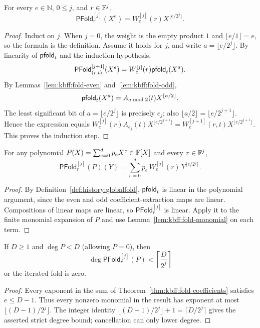 \begin{lemma}\label{lem:kbff:fold-monomial}
For every $e\in\mathbb N$, $0\leq j$, and $r\in\mathbb{F}^j$,
\[
 \mathsf{PFold}^{[j]}_r(X^e)
 =W_e^{[j]}(r)X^{\lfloor e/2^j\rfloor}.
\]
\end{lemma}
\begin{proof}
Induct on $j$. When $j=0$, the weight is the empty product $1$ and
$\lfloor e/1\rfloor=e$, so the formula is the definition.
Assume it holds for $j$, and write $a=\lfloor e/2^j\rfloor$.
By linearity of $\mathsf{pfold}_t$ and the induction hypothesis,
\[
 \mathsf{PFold}^{[j+1]}_{(r,t)}(X^e)
 =W_e^{[j]}(r)\mathsf{pfold}_t(X^a).
\]
By Lemmas~\ref{lem:kbff:fold-even} and~\ref{lem:kbff:fold-odd},
\[
 \mathsf{pfold}_t(X^a)=A_{a\bmod2}(t)X^{\lfloor a/2\rfloor}.
\]
The least significant bit of $a=\lfloor e/2^j\rfloor$ is precisely
$e_j$; also $\lfloor a/2\rfloor=\lfloor e/2^{j+1}\rfloor$.
Hence the expression equals
$W_e^{[j]}(r)A_{e_j}(t)X^{\lfloor e/2^{j+1}\rfloor}
=W_e^{[j+1]}(r,t)X^{\lfloor e/2^{j+1}\rfloor}$.
This proves the induction step.
\end{proof}

\begin{theorem}\label{thm:kbff:fold-coefficients}
For any polynomial $P(X)=\sum_{e=0}^d p_eX^e\in\mathbb{F}[X]$ and every $r\in\mathbb{F}^j$,
\[
 \boxed{\mathsf{PFold}^{[j]}_r(P)(Y)
 =\sum_{e=0}^d p_e\,W_e^{[j]}(r)\,Y^{\lfloor e/2^j\rfloor}.}
\]
\end{theorem}
\begin{proof}
By Definition~\ref{def:history:globalfold}, $\mathsf{pfold}_t$ is linear in the polynomial argument, since the even and odd coefficient-extraction maps are linear. Compositions of linear maps are linear, so $\mathsf{PFold}^{[j]}_r$ is linear. Apply it to the finite monomial expansion of $P$ and use Lemma~\ref{lem:kbff:fold-monomial} on each term.
\end{proof}

\begin{corollary}\label{cor:kbff:fold-degree}
If $D\geq1$ and $\deg P<D$ (allowing $P=0$), then
\[
 \deg\mathsf{PFold}^{[j]}_r(P)
 <\left\lceil\frac{D}{2^j}\right\rceil
\]
or the iterated fold is zero.
\end{corollary}
\begin{proof}
Every exponent in the sum of Theorem~\ref{thm:kbff:fold-coefficients} satisfies
$e\leq D-1$. Thus every nonzero monomial in the result has exponent at most
$\lfloor(D-1)/2^j\rfloor$. The integer identity
$\lfloor(D-1)/2^j\rfloor+1=\lceil D/2^j\rceil$
gives the asserted strict degree bound; cancellation can only lower degree.
\end{proof}

